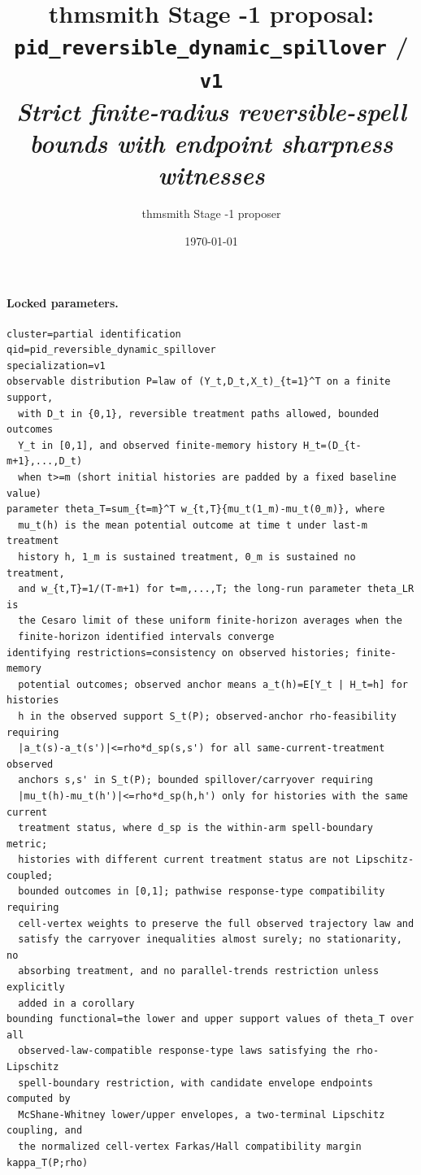 \documentclass[11pt]{article}
\title{thmsmith Stage -1 proposal: \texttt{pid\_reversible\_dynamic\_spillover} / \texttt{v1}%
  \\ \large\textit{Strict finite-radius reversible-spell bounds with endpoint sharpness witnesses}}
\author{thmsmith Stage -1 proposer}
\date{\today}
\theoremstyle{definition}
\theoremstyle{plain}
\theoremstyle{remark}
\begin{document}
\maketitle


\paragraph{Locked parameters.}
\begin{verbatim}
cluster=partial identification
qid=pid_reversible_dynamic_spillover
specialization=v1
observable distribution P=law of (Y_t,D_t,X_t)_{t=1}^T on a finite support,
  with D_t in {0,1}, reversible treatment paths allowed, bounded outcomes
  Y_t in [0,1], and observed finite-memory history H_t=(D_{t-m+1},...,D_t)
  when t>=m (short initial histories are padded by a fixed baseline value)
parameter theta_T=sum_{t=m}^T w_{t,T}{mu_t(1_m)-mu_t(0_m)}, where
  mu_t(h) is the mean potential outcome at time t under last-m treatment
  history h, 1_m is sustained treatment, 0_m is sustained no treatment,
  and w_{t,T}=1/(T-m+1) for t=m,...,T; the long-run parameter theta_LR is
  the Cesaro limit of these uniform finite-horizon averages when the
  finite-horizon identified intervals converge
identifying restrictions=consistency on observed histories; finite-memory
  potential outcomes; observed anchor means a_t(h)=E[Y_t | H_t=h] for histories
  h in the observed support S_t(P); observed-anchor rho-feasibility requiring
  |a_t(s)-a_t(s')|<=rho*d_sp(s,s') for all same-current-treatment observed
  anchors s,s' in S_t(P); bounded spillover/carryover requiring
  |mu_t(h)-mu_t(h')|<=rho*d_sp(h,h') only for histories with the same current
  treatment status, where d_sp is the within-arm spell-boundary metric;
  histories with different current treatment status are not Lipschitz-coupled;
  bounded outcomes in [0,1]; pathwise response-type compatibility requiring
  cell-vertex weights to preserve the full observed trajectory law and
  satisfy the carryover inequalities almost surely; no stationarity, no
  absorbing treatment, and no parallel-trends restriction unless explicitly
  added in a corollary
bounding functional=the lower and upper support values of theta_T over all
  observed-law-compatible response-type laws satisfying the rho-Lipschitz
  spell-boundary restriction, with candidate envelope endpoints computed by
  McShane-Whitney lower/upper envelopes, a two-terminal Lipschitz coupling, and
  the normalized cell-vertex Farkas/Hall compatibility margin kappa_T(P;rho)
\end{verbatim}
\end{document}
